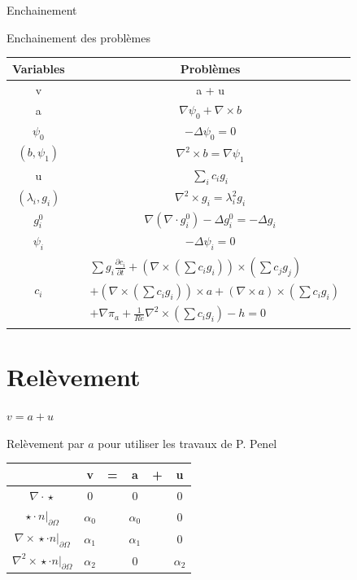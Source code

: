\documentclass{beamer}
\newcommand{\grad}{{\nabla}}
\newcommand{\laplace}{{\Delta}}
\newcommand{\rot}{{\nabla\times}}
\newcommand{\rott}{{\nabla^2\times}}
\newcommand{\diverg}{{\nabla\cdot}}
\newcommand{\restr}{{\big\rvert_{\partial\Omega}}}
\begin{document}
\begin{frame}{Enchainement}
\begin{block}{Enchainement des problèmes}
\begin{center}
\begin{tabular}{|c|c|}
\hline
Variables & Problèmes\\ \hline
v & a + u \\ \hline
a & $\grad\psi_0 + \rot b$\\ \hline
$\psi_0$ & $-\laplace\psi_0 = 0$\\ \hline
$(b,\psi_1)$ & $\rott b= \grad\psi_1$ \\ \hline
u & $\sum_i c_ig_i$ \\ \hline
$(\lambda_i,g_i)$ & $\rott  g_i = \lambda_i^2 g_i$ \\ \hline
$g_i^0$ & $\grad(\diverg g_i^0) - \laplace g_i^0 = - \laplace g_i$\\ \hline
$\psi_i$ & $-\laplace \psi_i = 0$\\ \hline
$c_i$ & $\begin{aligned}
&\sum g_i\frac{\partial c_i}{\partial t} + (\rot(\sum c_ig_i))\times(\sum c_jg_j)\\
&+(\rot(\sum c_ig_i))\times a + (\rot a)\times(\sum c_ig_i) \\
&+ \grad\pi_a + \frac{1}{Re}\rott(\sum c_ig_i) - h = 0
\end{aligned}$\\ \hline
\end{tabular}
\end{center}
\end{block}
\end{frame}

\section{Relèvement}
\begin{frame}{$v=a+u$}
\begin{block}{Relèvement par $a$ pour utiliser les travaux de P. Penel}
\begin{center}
\begin{tabular}{c|ccccc}
& v & = & a & + & u \\ \hline
$\diverg\star$ & 0 & & 0 & & 0\\ \hline
$\star\cdot n\restr$ & $\alpha_0$ & & $\alpha_0$ & & 0\\ \hline
$\rot\star\cdot n\restr$ & $\alpha_1$ & & $\alpha_1$ & & 0\\\hline
$\rott\star\cdot n\restr$ & $\alpha_2$ & & 0 & & $\alpha_2$ 
\end{tabular}
\end{center}
\end{block}
\end{frame}
\end{document}
